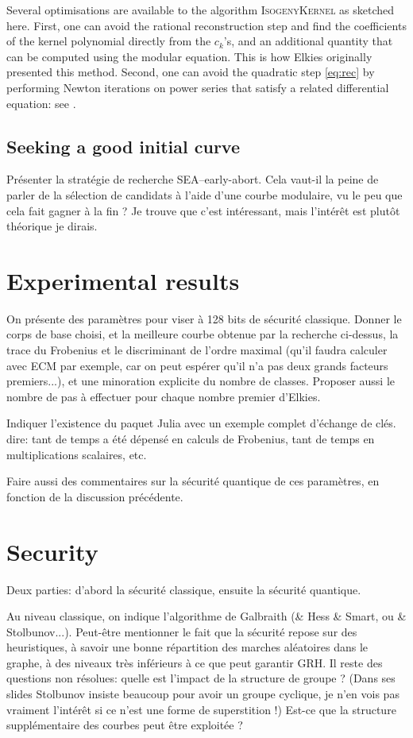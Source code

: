\documentclass{article}
\newcommand{\algstyle}[1]{\textsc{#1}}
\theoremstyle{definition}
\begin{document}
Several optimisations are available to the algorithm \algstyle{IsogenyKernel}
as sketched here. First, one can avoid the rational reconstruction step and
find the coefficients of the kernel polynomial directly from the $c_k$'s,
and an additional quantity that can be computed using the modular equation.
This is how Elkies originally presented this method. Second, one can avoid
the quadratic step \ref{eq:rec} by performing Newton iterations on power
series that satisfy a related differential equation: see \cite{}.


\subsection{Seeking a good initial curve}

Présenter la stratégie de
recherche SEA--early-abort. Cela vaut-il la peine de parler de la
sélection de candidats à l'aide d'une courbe modulaire, vu le peu que
cela fait gagner à la fin ? Je trouve que c'est intéressant, mais
l'intérêt est plutôt théorique je dirais.

\section{Experimental results}

On présente des paramètres pour viser à 128 bits de sécurité
classique.  Donner le corps de base choisi, et la meilleure courbe
obtenue par la recherche ci-dessus, la trace du Frobenius et le
discriminant de l'ordre maximal (qu'il faudra calculer avec ECM par
exemple, car on peut espérer qu'il n'a pas deux grands facteurs
premiers...), et une minoration explicite du nombre de classes.
Proposer aussi le nombre de pas à effectuer pour chaque nombre premier
d'Elkies.

Indiquer l'existence du paquet Julia avec un exemple complet d'échange
de clés. dire: tant de temps a été dépensé en
calculs de Frobenius, tant de temps en multiplications scalaires, etc.

Faire aussi des commentaires sur la sécurité quantique de ces
paramètres, en fonction de la discussion précédente. 

\section{Security}

Deux parties: d'abord la sécurité classique, ensuite la sécurité quantique.

Au niveau classique, on indique l'algorithme de Galbraith (\& Hess \&
Smart, ou \& Stolbunov...). Peut-être mentionner le fait que la
sécurité repose sur des heuristiques, à savoir une bonne répartition
des marches aléatoires dans le graphe, à des niveaux très inférieurs à
ce que peut garantir GRH.  Il reste des questions non résolues: quelle
est l'impact de la structure de groupe ? (Dans ses slides Stolbunov
insiste beaucoup pour avoir un groupe cyclique, je n'en vois pas
vraiment l'intérêt si ce n'est une forme de superstition !)  Est-ce
que la structure supplémentaire des courbes peut être exploitée ?
\end{document}
